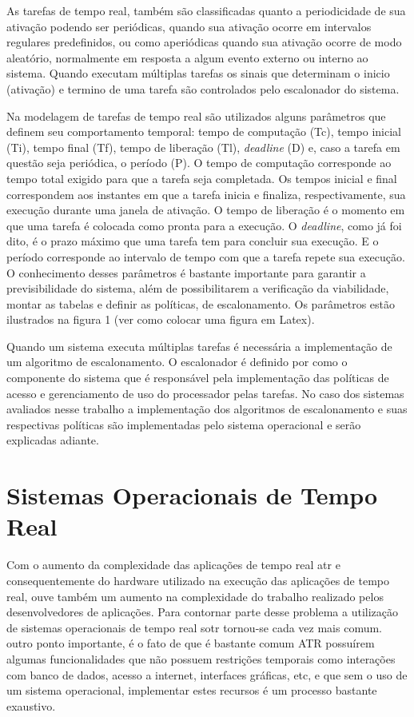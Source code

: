 As tarefas de tempo real, também são classificadas quanto a periodicidade de sua ativação podendo ser periódicas, quando sua ativação ocorre em intervalos regulares predefinidos, ou como aperiódicas quando sua ativação ocorre de modo aleatório, normalmente em resposta a algum evento externo ou interno ao sistema. Quando executam múltiplas tarefas os sinais que determinam o inicio (ativação) e termino de uma tarefa são controlados pelo escalonador do sistema.

Na modelagem de tarefas de tempo real são utilizados alguns parâmetros que definem seu comportamento temporal: tempo de computação (Tc), tempo inicial (Ti), tempo final (Tf), tempo de liberação (Tl), \textit{deadline} (D) e, caso a tarefa em questão seja periódica, o período (P). O tempo de computação corresponde ao tempo total exigido para que a tarefa seja completada. Os tempos inicial e final correspondem aos instantes em que a tarefa inicia e finaliza, respectivamente, sua execução durante uma janela de ativação. O tempo de liberação é o momento em que uma tarefa é colocada como pronta para a execução. O \textit{deadline}, como já foi dito, é o prazo máximo que uma tarefa tem para concluir sua execução. E o período corresponde ao intervalo de tempo com que a tarefa repete sua execução. O conhecimento desses parâmetros é bastante importante para garantir a previsibilidade do sistema, além de possibilitarem a verificação da viabilidade, montar as tabelas e definir as políticas, de escalonamento. Os parâmetros estão ilustrados na figura 1 (ver como colocar uma figura em Latex).

Quando um sistema executa múltiplas tarefas é necessária a implementação de um algoritmo de escalonamento. O escalonador é definido por \cite{Farines2000} como o componente do sistema que é responsável pela implementação das políticas de acesso e gerenciamento de uso do processador pelas tarefas. No caso dos sistemas avaliados nesse trabalho a implementação dos algoritmos de escalonamento e suas respectivas políticas são implementadas pelo sistema operacional e serão explicadas adiante.

\section{Sistemas Operacionais de Tempo Real}
Com o aumento da complexidade das aplicações de tempo real \gls{atr} e consequentemente do hardware utilizado na execução das aplicações de tempo real, ouve também um aumento na complexidade do trabalho realizado pelos desenvolvedores de aplicações. Para contornar parte desse problema a utilização de sistemas operacionais de tempo real \gls{sotr} tornou-se cada vez mais comum. outro ponto importante, é o fato de que é bastante comum ATR possuírem  algumas funcionalidades que não possuem restrições temporais como interações com banco de dados, acesso a internet, interfaces gráficas, etc, e que sem o uso de um sistema operacional, implementar estes recursos é um processo bastante exaustivo.  

